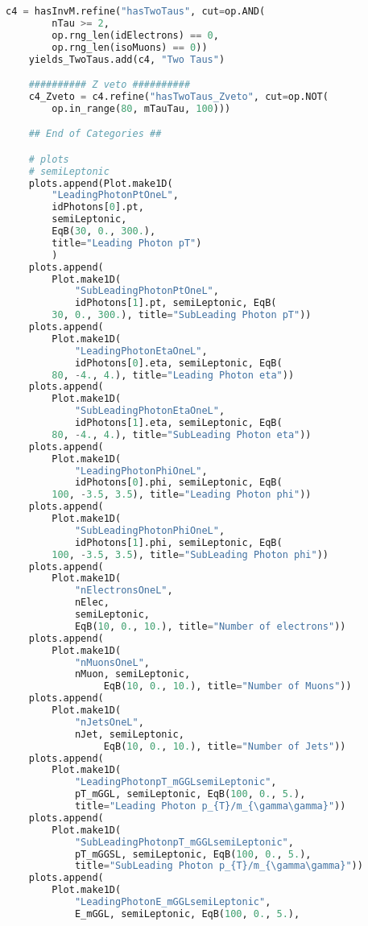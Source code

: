 \begin{lstlisting}[language=Python, caption=Python module of the analysis used in Bamboo framework, label={bamboocode}]
    c4 = hasInvM.refine("hasTwoTaus", cut=op.AND(
        nTau >= 2,
        op.rng_len(idElectrons) == 0,
        op.rng_len(isoMuons) == 0))
    yields_TwoTaus.add(c4, "Two Taus")

    ########## Z veto ##########
    c4_Zveto = c4.refine("hasTwoTaus_Zveto", cut=op.NOT(
        op.in_range(80, mTauTau, 100)))

    ## End of Categories ##

    # plots
    # semiLeptonic
    plots.append(Plot.make1D(
        "LeadingPhotonPtOneL",
        idPhotons[0].pt,
        semiLeptonic,
        EqB(30, 0., 300.),
        title="Leading Photon pT")
        )
    plots.append(
        Plot.make1D(
            "SubLeadingPhotonPtOneL",
            idPhotons[1].pt, semiLeptonic, EqB(
        30, 0., 300.), title="SubLeading Photon pT"))
    plots.append(
        Plot.make1D(
            "LeadingPhotonEtaOneL",
            idPhotons[0].eta, semiLeptonic, EqB(
        80, -4., 4.), title="Leading Photon eta"))
    plots.append(
        Plot.make1D(
            "SubLeadingPhotonEtaOneL",
            idPhotons[1].eta, semiLeptonic, EqB(
        80, -4., 4.), title="SubLeading Photon eta"))
    plots.append(
        Plot.make1D(
            "LeadingPhotonPhiOneL",
            idPhotons[0].phi, semiLeptonic, EqB(
        100, -3.5, 3.5), title="Leading Photon phi"))
    plots.append(
        Plot.make1D(
            "SubLeadingPhotonPhiOneL",
            idPhotons[1].phi, semiLeptonic, EqB(
        100, -3.5, 3.5), title="SubLeading Photon phi"))
    plots.append(
        Plot.make1D(
            "nElectronsOneL",
            nElec,
            semiLeptonic,
            EqB(10, 0., 10.), title="Number of electrons"))
    plots.append(
        Plot.make1D(
            "nMuonsOneL",
            nMuon, semiLeptonic,
                 EqB(10, 0., 10.), title="Number of Muons"))
    plots.append(
        Plot.make1D(
            "nJetsOneL",
            nJet, semiLeptonic,
                 EqB(10, 0., 10.), title="Number of Jets"))
    plots.append(
        Plot.make1D(
            "LeadingPhotonpT_mGGLsemiLeptonic",
            pT_mGGL, semiLeptonic, EqB(100, 0., 5.),
            title="Leading Photon p_{T}/m_{\gamma\gamma}"))
    plots.append(
        Plot.make1D(
            "SubLeadingPhotonpT_mGGLsemiLeptonic",
            pT_mGGSL, semiLeptonic, EqB(100, 0., 5.),
            title="SubLeading Photon p_{T}/m_{\gamma\gamma}"))
    plots.append(
        Plot.make1D(
            "LeadingPhotonE_mGGLsemiLeptonic",
            E_mGGL, semiLeptonic, EqB(100, 0., 5.),

\end{lstlisting}
